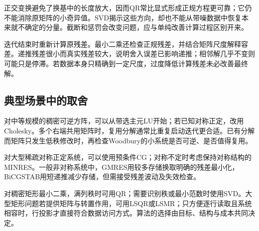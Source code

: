 正交变换避免了换基中的长度放大，因而QR常比显式形成正规方程更可靠；它仍不能消除原矩阵的小奇异值。SVD揭示这些方向，却也不能从带噪数据中恢复本来就不确定的分量。截断和惩罚会改变问题，应与单纯改善计算过程区别开来。

迭代结束时重新计算原残差。最小二乘还检查正规残差，并结合矩阵尺度解释容差。递推残差很小而真实残差较大，说明舍入误差已影响递推；相邻解几乎不变则可能只是停滞。若数据本身只精确到一定尺度，过度降低计算残差未必改善最终解。

\subsection{典型场景中的取舍}

对中等规模的稠密可逆方阵，可以从带选主元LU开始；若已知对称正定，改用Cholesky。多个右端共用矩阵时，复用分解通常比重复启动迭代更合适。已有分解而矩阵只发生低秩修改时，再检查Woodbury的小系统是否可逆、是否值得复用。

对大型稀疏对称正定系统，可以使用预条件CG；对称不定时考虑保持对称结构的MINRES。一般非对称系统中，GMRES用较多存储换取明确的残差最小化，BiCGSTAB用短递推减少存储，但需接受残差波动及失效检查。

对稠密矩形最小二乘，满列秩时可用QR；需要识别秩或最小范数时使用SVD。大型矩形问题若提供矩阵与转置作用，可用LSQR或LSMR；只方便逐行读取且系统相容时，行投影才直接符合数据访问方式。算法的选择由目标、结构与成本共同决定。
